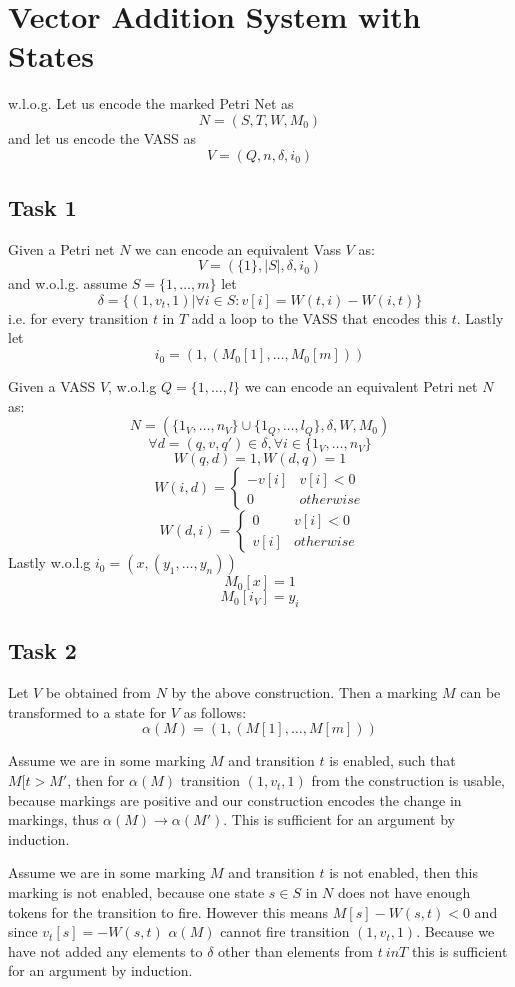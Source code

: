 \section{Vector Addition System with States}

w.l.o.g.
Let us encode the marked Petri Net as
\[N=(S,T,W,M_0)\]
and let us encode the VASS as
\[V=(Q,n,\delta,i_0)\]

\subsection{Task 1}
Given a Petri net $N$ we can encode an equivalent Vass $V$ as:
\[V=(\{1\},|S|,\delta,i_0)\]
and w.o.l.g. assume $S=\{1,\dots,m\}$ let
\[\delta=\{(1,v_t,1)|\forall i \in S : v[i]=W(t,i)-W(i,t)\}\]
i.e. for every transition $t$ in $T$ add a loop to the VASS that encodes this $t$. Lastly let
\[i_0=(1,(M_0[1],\dots,M_0[m]))\]

Given a VASS $V$, w.o.l.g $Q=\{1,\dots,l\}$ we can encode an equivalent Petri net $N$ as:
\[ N=(\{1_V,\dots,n_V \} \cup \{1_Q,\dots,l_Q\},\delta,W,M_0)\]
\[\forall d=(q,v,q') \in \delta, \forall i \in \{1_V,\dots,n_V\}\] 
\[W(q,d)=1, W(d,q)=1\]
\[W(i,d)=
	\begin{cases} 
      -v[i] & v[i]<0\\
      0 & otherwise
	\end{cases}\]
\[W(d,i)=
	\begin{cases} 
      0 & v[i]<0\\
      v[i] & otherwise
	\end{cases}\]
Lastly w.o.l.g $i_0=(x,(y_1,\dots,y_n))$
\[M_0[x]=1\]
\[M_0[i_V]=y_i\]

\subsection{Task 2}

Let $V$ be obtained from $N$ by the above construction. Then a marking $M$ can be transformed to a state for $V$ as follows:
\[\alpha(M)=(1,(M[1],\dots,M[m]))\]

Assume we are in some marking $M$ and transition $t$ is enabled, such that $M[t>M'$, then for $\alpha(M)$ transition $(1,v_t,1)$ from the construction is usable, because markings are positive and our construction encodes the change in markings, thus $\alpha(M)\rightarrow \alpha(M')$. This is sufficient for an argument by induction.

Assume we are in some marking $M$ and transition $t$ is not enabled, then this marking is not enabled, because one state $s\in S$ in $N$ does not have enough tokens for the transition to fire. However this means $M[s]-W(s,t)<0$ and since $v_t[s]=-W(s,t)$ $\alpha(M)$ cannot fire transition $(1,v_t,1)$. Because we have not added any elements to $\delta$ other than elements from $t\ in T$ this is sufficient for an argument by induction.

